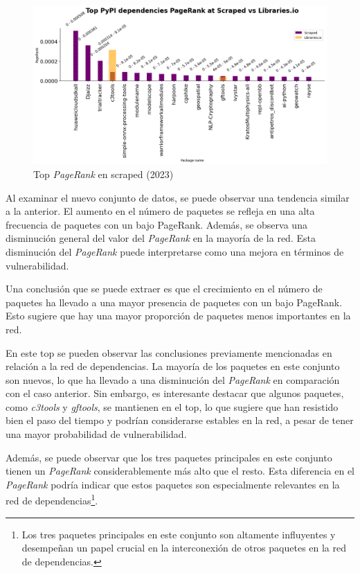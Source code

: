 \begin{figure}[h!]
    \begin{center}
        \includegraphics[width=1\textwidth]{img/pypi/t20_dep_pr_scraped.png}
        \caption{Top \textit{PageRank} en scraped (2023)}
        \label{fig:Top PageRank en scraped}
    \end{center}
\end{figure}

Al examinar el nuevo conjunto de datos, se puede observar una tendencia similar a la anterior.
El aumento en el número de paquetes se refleja en una alta frecuencia de paquetes con un bajo
PageRank. Además, se observa una disminución general del valor del \textit{PageRank} en la mayoría de
la red. Esta disminución del \textit{PageRank} puede interpretarse como una mejora en términos de
vulnerabilidad.

Una conclusión que se puede extraer es que el crecimiento en el número de paquetes ha llevado
a una mayor presencia de paquetes con un bajo PageRank. Esto sugiere que hay una mayor
proporción de paquetes menos importantes en la red.

En este top se pueden observar las conclusiones previamente mencionadas en relación a la red de
dependencias. La mayoría de los paquetes en este conjunto son nuevos, lo que ha llevado a una
disminución del \textit{PageRank} en comparación con el caso anterior. Sin embargo, es
interesante destacar que algunos paquetes, como \textit{c3tools} y
\textit{gftools},
se mantienen en el top, lo que sugiere que han resistido bien el paso del tiempo y podrían
considerarse estables en la red, a pesar de tener una mayor probabilidad de
vulnerabilidad.

Además, se puede observar que los tres paquetes principales en este conjunto tienen
un \textit{PageRank} considerablemente más alto que el resto. Esta diferencia en
el \textit{PageRank} podría indicar que estos paquetes son especialmente relevantes
en la red de dependencias\footnote{Los tres paquetes principales en este conjunto son
    altamente influyentes y desempeñan un papel crucial en la interconexión de otros paquetes
    en la red de dependencias.}.

